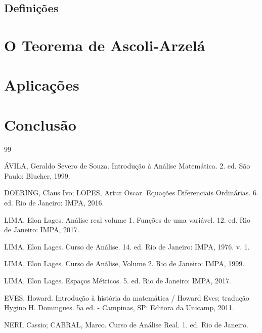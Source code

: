 \documentclass[a4paper,12pt]{report}
\begin{document}
	
	\section{Definições}
	
	
	
	
	
	\newpage
	
	
	\chapter{O Teorema de Ascoli-Arzelá}
	
	
	\newpage
	
	
	\chapter{Aplicações}
	
	
	
	\newpage
	
	
	\chapter*{Conclusão}
	
	
	
	
	\newpage
	
	
	\begin{thebibliography}{99}
		
		 ÁVILA, Geraldo Severo de Souza. Introdução à Análise Matemática. 2. ed. São Paulo: Blucher, 1999.
		
		 DOERING, Claus Ivo; LOPES, Artur Oscar. Equações Diferenciais Ordinárias. 6. ed. Rio de Janeiro: IMPA, 2016. 
		
		 LIMA, Elon Lages. Análise real volume 1. Funções de uma variável. 12. ed. Rio de Janeiro: IMPA, 2017.
		
		 LIMA, Elon Lages. Curso de Análise. 14. ed. Rio de Janeiro: IMPA, 1976. v. 1. 
		
		 LIMA, Elon Lages. Curso de Análise, Volume 2. Rio de Janeiro: IMPA, 1999.
		
		 LIMA, Elon Lages. Espaços Métricos. 5. ed. Rio de Janeiro: IMPA, 2017.
		
		 EVES, Howard. Introdução à história da matemática / Howard Eves; tradução Hygino H. Domingues. 5a ed. - Campinas, SP: Editora da Unicamp, 2011.
		
		 NERI, Cassio; CABRAL, Marco. Curso de Análise Real. 1. ed. Rio de Janeiro.
		
		
		
	\end{thebibliography}
	
	
	\newpage
	
	
	
	
	
\end{document}
